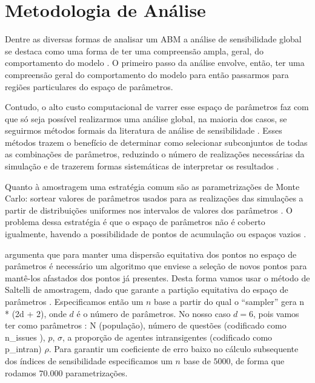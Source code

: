 \section{Metodologia de Análise}

Dentre as diversas formas de analisar um ABM a análise de sensibilidade global
se destaca como uma forma de ter uma compreensão ampla, geral, do comportamento
do modelo \cite{north2007managing}. O primeiro passo da análise envolve, então,
 ter uma compreensão geral do comportamento do modelo para então passarmos
para regiões particulares do espaço de parâmetros.

Contudo, o alto custo computacional de varrer esse espaço de parâmetros faz com
que só seja possível realizarmos uma análise global, na maioria dos casos, se
seguirmos métodos formais da literatura de análise de sensibilidade
\cite{railsback2012agent}. Esses métodos trazem o benefício de determinar como
selecionar subconjuntos de todas as combinações de parâmetros, reduzindo o
número de realizações necessárias da simulação e de trazerem formas sistemáticas
de interpretar os resultados \cite{railsback2012agent}.

Quanto à amostragem uma estratégia comum são as parametrizações de Monte Carlo:
sortear valores de parâmetros usados para as realizações das simulações a partir
de distribuições uniformes nos intervalos de valores dos parâmetros
\cite{laver2011party}. O problema dessa estratégia é que o espaço de parâmetros
não é coberto igualmente, havendo a possibilidade de pontos de acumulação ou
espaços vazios \cite{pereda2017brief}.

 argumenta que para manter uma dispersão equitativa
dos pontos no espaço de parâmetros é necessário um algoritmo que enviese a
seleção de novos pontos para mantê-los afastados dos pontos já presentes. Desta
forma vamos usar o método de Saltelli de amostragem, dado que garante a partição
equitativa do espaço de parâmetros \cite{herman2017salib}. Especificamos então
um \(n\) base a partir do qual o ``sampler'' gera n * (2d + 2), onde \(d\) é o
número de parâmetros. No nosso caso \(d = 6\), pois vamos ter como parâmetros :
N (população), número de questões (codificado como n\_issues ), \(p\), \(\sigma\), a
proporção de agentes intransigentes (codificado como p\_intran)
\(\rho\). Para garantir um coeficiente de erro baixo no cálculo
subsequente dos índices de sensibilidade especificamos um \(n\) base de
\(5000\), de forma que rodamos \(70.000\) parametrizações.



